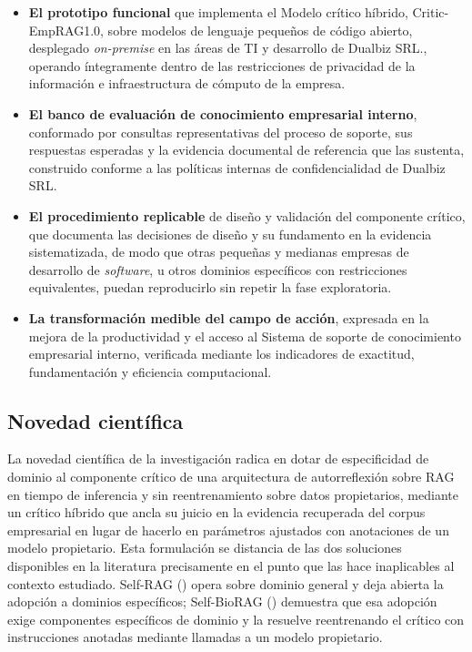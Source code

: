 \begin{itemize}
	\item \textbf{El prototipo funcional} que implementa el Modelo crítico híbrido, Critic-EmpRAG1.0, sobre modelos de lenguaje pequeños de código abierto, desplegado \textit{on-premise} en las áreas de TI y desarrollo de Dualbiz SRL., operando íntegramente dentro de las restricciones de privacidad de la información e infraestructura de cómputo de la empresa.
	\item \textbf{El banco de evaluación de conocimiento empresarial interno}, conformado por consultas representativas del proceso de soporte, sus respuestas esperadas y la evidencia documental de referencia que las sustenta, construido conforme a las políticas internas de confidencialidad de Dualbiz SRL.
	\item \textbf{El procedimiento replicable} de diseño y validación del componente crítico, que documenta las decisiones de diseño y su fundamento en la evidencia sistematizada, de modo que otras pequeñas y medianas empresas de desarrollo de \textit{software}, u otros dominios específicos con restricciones equivalentes, puedan reproducirlo sin repetir la fase exploratoria.
	\item \textbf{La transformación medible del campo de acción}, expresada en la mejora de la productividad y el acceso al Sistema de soporte de conocimiento empresarial interno, verificada mediante los indicadores de exactitud, fundamentación y eficiencia computacional.
\end{itemize}

\subsection*{Novedad científica}

La novedad científica de la investigación radica en dotar de especificidad de dominio al componente crítico de una arquitectura de autorreflexión sobre RAG en tiempo de inferencia y sin reentrenamiento sobre datos propietarios, mediante un crítico híbrido que ancla su juicio en la evidencia recuperada del corpus empresarial en lugar de hacerlo en parámetros ajustados con anotaciones de un modelo propietario. Esta formulación se distancia de las dos soluciones disponibles en la literatura precisamente en el punto que las hace inaplicables al contexto estudiado. Self-RAG (\cite{Asai2024_Selfrag}) opera sobre dominio general y deja abierta la adopción a dominios específicos; Self-BioRAG (\cite{jeong_improving_2024}) demuestra que esa adopción exige componentes específicos de dominio y la resuelve reentrenando el crítico con instrucciones anotadas mediante llamadas a un modelo propietario. 

